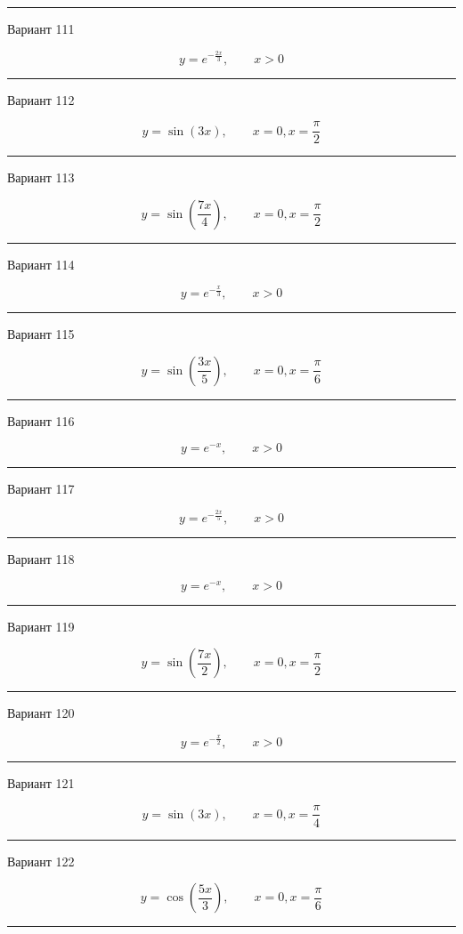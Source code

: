 \documentclass[11pt]{report}
\begin{document}
\rule{\textwidth}{.2mm}

Вариант 111

$$y=e^{- \frac{2 x}{3}}, \qquad x > 0$$

\rule{\textwidth}{.2mm}

Вариант 112

$$y=\sin{\left(3 x \right)}, \qquad x = 0, x = \frac{\pi}{2}$$

\rule{\textwidth}{.2mm}

Вариант 113

$$y=\sin{\left(\frac{7 x}{4} \right)}, \qquad x = 0, x = \frac{\pi}{2}$$

\rule{\textwidth}{.2mm}

Вариант 114

$$y=e^{- \frac{x}{3}}, \qquad x > 0$$

\rule{\textwidth}{.2mm}

Вариант 115

$$y=\sin{\left(\frac{3 x}{5} \right)}, \qquad x = 0, x = \frac{\pi}{6}$$

\rule{\textwidth}{.2mm}

Вариант 116

$$y=e^{- x}, \qquad x > 0$$

\rule{\textwidth}{.2mm}

Вариант 117

$$y=e^{- \frac{2 x}{5}}, \qquad x > 0$$

\rule{\textwidth}{.2mm}

Вариант 118

$$y=e^{- x}, \qquad x > 0$$

\rule{\textwidth}{.2mm}

Вариант 119

$$y=\sin{\left(\frac{7 x}{2} \right)}, \qquad x = 0, x = \frac{\pi}{2}$$

\rule{\textwidth}{.2mm}

Вариант 120

$$y=e^{- \frac{x}{2}}, \qquad x > 0$$

\rule{\textwidth}{.2mm}


Вариант 121

$$y=\sin{\left(3 x \right)}, \qquad x = 0, x = \frac{\pi}{4}$$

\rule{\textwidth}{.2mm}

Вариант 122

$$y=\cos{\left(\frac{5 x}{3} \right)}, \qquad x = 0, x = \frac{\pi}{6}$$

\rule{\textwidth}{.2mm}
\end{document}

